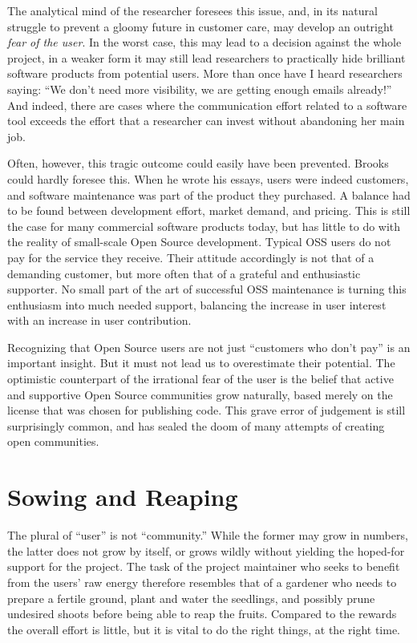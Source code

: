The analytical mind of the researcher foresees this issue, and, in its natural struggle to prevent a gloomy future in customer care, may develop an outright \emph{fear of the user}. In the worst case, this may lead to a decision against the whole project, in a weaker form it may still lead researchers to practically hide brilliant software products from potential users. More than once have I heard researchers saying: ``We don't need more visibility, we are getting enough emails already!''  And indeed, there are cases where the communication effort related to a software tool exceeds the effort that a researcher can invest without abandoning her main job.

Often, however, this tragic outcome could easily have been prevented. Brooks could hardly foresee this. When he wrote his essays, users were indeed customers, and software maintenance was part of the product they purchased. A balance had to be found between development effort, market demand, and pricing. This is still the case for many commercial software products today, but has little to do with the reality of small-scale Open Source development. Typical OSS users do not pay for the service they receive. Their attitude accordingly is not that of a demanding customer, but more often that of a grateful and enthusiastic supporter. No small part of the art of successful OSS maintenance is turning this enthusiasm into much needed support, balancing the increase in user interest with an increase in user contribution.

Recognizing that Open Source users are not just ``customers who don't pay'' is an important insight. But it must not lead us to overestimate their potential. The optimistic counterpart of the irrational fear of the user is the belief that active and supportive Open Source communities grow naturally, based merely on the license that was chosen for publishing code. This grave error of judgement is still surprisingly common, and has sealed the doom of many attempts of creating open communities.

\section*{Sowing and Reaping}

The plural of ``user'' is not ``community.'' While the former may grow in numbers, the latter does not grow by itself, or grows wildly without yielding the hoped-for support for the project. The task of the project maintainer who seeks to benefit from the users' raw energy therefore resembles that of a gardener who needs to prepare a fertile ground, plant and water the seedlings, and possibly prune undesired shoots before being able to reap the fruits. Compared to the rewards the overall effort is little, but it is vital to do the right things, at the right time.

